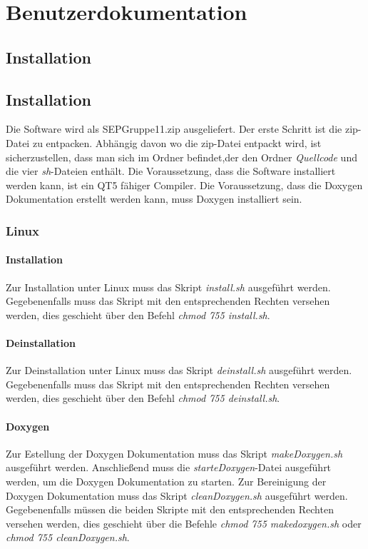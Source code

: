 \chapter{Benutzerdokumentation}

\section{Installation}

\section{Installation}
Die Software wird als SEPGruppe11.zip ausgeliefert. Der erste Schritt ist die zip-Datei zu entpacken. Abhängig davon wo die zip-Datei entpackt wird, ist sicherzustellen, dass man sich im Ordner befindet,der den Ordner \emph{Quellcode} und die vier \emph{sh}-Dateien enthält.
Die Voraussetzung, dass die Software installiert werden kann, ist ein QT5 fähiger Compiler.
Die Voraussetzung, dass die Doxygen Dokumentation erstellt werden kann, muss Doxygen installiert sein.
\subsection{Linux}
\subsubsection{Installation}
Zur Installation unter Linux muss das Skript \emph{install.sh} ausgeführt werden. Gegebenenfalls muss das Skript mit den entsprechenden Rechten versehen werden, dies geschieht über den Befehl \emph{chmod 755 install.sh}.
\subsubsection{Deinstallation}
Zur Deinstallation unter Linux muss das Skript \emph{deinstall.sh} ausgeführt werden. Gegebenenfalls muss das Skript mit den entsprechenden Rechten versehen werden, dies geschieht über den Befehl \emph{chmod 755 deinstall.sh}.
\subsubsection{Doxygen} \label{Installation Doxygen}
Zur Estellung der Doxygen Dokumentation muss das Skript \emph{makeDoxygen.sh} ausgeführt werden. Anschließend muss die \emph{starteDoxygen}-Datei ausgeführt werden, um die Doxygen Dokumentation zu starten. Zur Bereinigung der Doxygen Dokumentation muss das Skript \emph{cleanDoxygen.sh} ausgeführt werden. Gegebenenfalls müssen die beiden Skripte mit den entsprechenden Rechten versehen werden, dies geschieht über die Befehle \emph{chmod 755 makedoxygen.sh} oder \emph{chmod 755 cleanDoxygen.sh}. 


